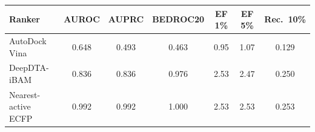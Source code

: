 \begin{tabular}{lcccccc}
\toprule
Ranker & AUROC & AUPRC & BEDROC20 & EF 1\% & EF 5\% & Rec.\ 10\% \\
\midrule
AutoDock Vina & 0.648 & 0.493 & 0.463 & 0.95 & 1.07 & 0.129 \\
DeepDTA-iBAM & 0.836 & 0.836 & 0.976 & 2.53 & 2.47 & 0.250 \\
Nearest-active ECFP & 0.992 & 0.992 & 1.000 & 2.53 & 2.53 & 0.253 \\
\bottomrule
\end{tabular}
